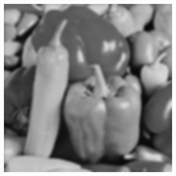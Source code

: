 \begin{figure}[htbp]
\begin{subfigure}[b]{0.2\textwidth}
    \vspace*{0.02\textwidth}
  \end{subfigure}%
  \hspace*{0.02\textwidth}
  \begin{subfigure}[b]{0.2\textwidth}
    \centering
    \includegraphics[width=\textwidth]{figs/fourier/peppers_blur_original.png}
    \vspace*{0.02\textwidth}
  \end{subfigure}


\end{figure}
